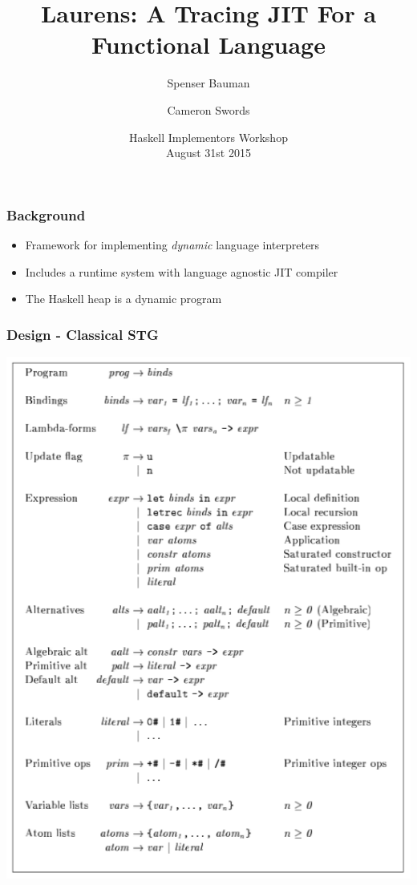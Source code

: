 \documentclass[xetex,serif,mathserif]{beamer}
\title{Laurens: A Tracing JIT For a Functional Language}
\author[shortname]{Spenser Bauman \and Cameron Swords}
\institute[shortinst]{
    Indiana University Bloomington, USA
}
\date{Haskell Implementors Workshop \\ August 31st 2015}
\newenvironment{slide}[1]{\begin{frame}\frametitle{#1}}{\end{frame}}
\begin{document}
\frame{\titlepage}

\begin{slide}{Background}
  \begin{itemize}
    \item Framework for implementing \emph{dynamic} language interpreters
    \item Includes a runtime system with language agnostic JIT compiler
    \item The Haskell heap is a dynamic program
  \end{itemize}
\end{slide}

\begin{slide}{Design - Classical STG}
  \begin{center}
  \includegraphics[scale=0.3]{stg-def}
  \end{center}
\end{slide}
\end{document}
